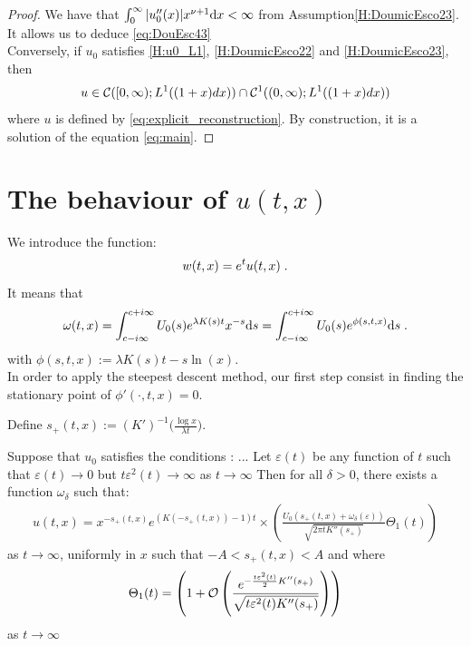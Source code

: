 \documentclass[11pt]{amsart}
\begin{document}
\begin{proof}
    We have that $\int_0^\infty |u_0''(x)| x^{\nu + 1} \mathrm dx < \infty$ from Assumption\eqref{H:DoumicEsco23}. It allows us to deduce \eqref{eq:DouEsc43} \\
    
    Conversely, if $u_0$ satisfies \eqref{H:u0_L1}, \eqref{H:DoumicEsco22} and \eqref{H:DoumicEsco23}, then 
     $$u \in \mathcal{C}([0, \infty); L^1((1+x)dx)) \cap \mathcal{C}^1((0, \infty); L^1((1+x)dx))$$
    where $u$ is defined by \eqref{eq:explicit_reconstruction}. By construction, it is a solution of the equation \eqref{eq:main}.
    \end{proof}

\section{The behaviour of $u(t,x)$}
We introduce the function: 
    \begin{align*}
        w(t,x) = e^t u(t,x)
        \; .
    \end{align*}
It means that
    \begin{equation*}
        \omega(t,x)
        = \int_{c-i\infty}^{c+i\infty} U_0(s) e^{\lambda K(s)t}x^{-s} \mathrm ds
        =  \int_{c-i\infty}^{c+i\infty} U_0(s) e^{\phi(s, t, x)} \mathrm ds
        \; .
    \end{equation*}
with $\phi(s,t,x) := \lambda K(s) t - s \ln(x) $.\\

In order to apply the steepest descent method, our first step consist in finding the stationary point of $\phi'(\cdot, t, x) = 0$. 

Define $ s_+(t,x) := (K')^{-1} \Big( \frac{\log x}{\lambda t} \Big)$.


\begin{theorem}
    Suppose that  $u_0$ satisfies the conditions : ...
    Let $\varepsilon(t)$ be any function of $t$ such that $\varepsilon(t) \to 0$ but $t\varepsilon^2(t) \to \infty$ as $t \to \infty$
Then for all $\delta > 0$, there exists a function $\omega_\delta$ such that:
\begin{equation*}
    \begin{split}
    u(t,x) = x^{-s_+(t,x)}e^{(K(-s_+(t,x))-1)t} \times 
    \left( \frac{U_0(s_+(t,x)+\omega_\delta(\varepsilon))}{\sqrt{2\pi tK''(s_+)}} \Theta_1(t)\right)
    \end{split}
\end{equation*}
as $t\to \infty$, uniformly in $x$ such that $-A < s_+(t,x)< A$ and where 
\begin{align*}
    \Theta_1(t) = \left(1 + \mathcal{O} \left( \frac{e^{-\frac{t\varepsilon^2(t)}{2}K''(s_+)}}{\sqrt{t\varepsilon^2(t)K''(s_+)}} \right) \right)
\end{align*}
as $t \to \infty$
\end{theorem}
\end{document}
